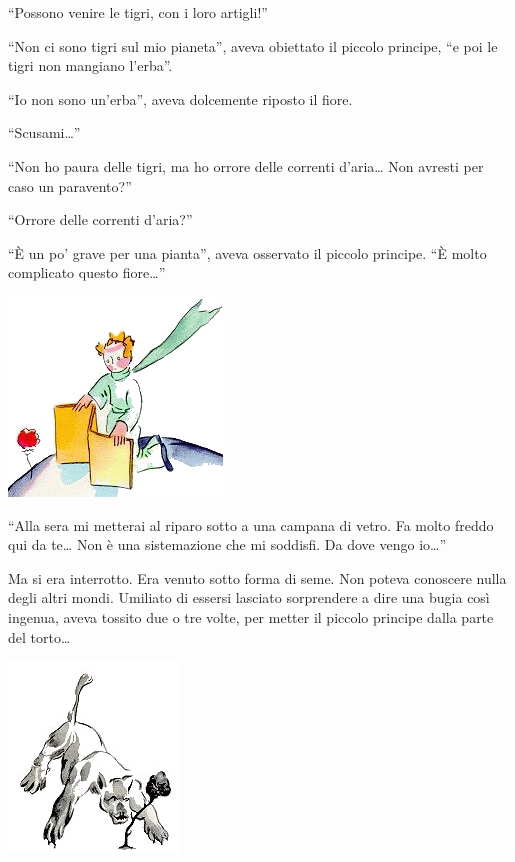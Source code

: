 \documentclass[11pt]{scrbook}
\begin{document}
``Possono venire le tigri, con i loro artigli!''

``Non ci sono tigri sul mio pianeta'', aveva obiettato il piccolo principe, ``e poi le tigri non mangiano l'erba''.

``Io non sono un'erba'', aveva dolcemente riposto il fiore.

``Scusami\ldots{}''

``Non ho paura delle tigri, ma ho orrore delle correnti d'aria\ldots{} Non avresti per caso un paravento?''

``Orrore delle correnti d'aria?''

``È un po' grave per una pianta'', aveva osservato il piccolo principe. ``È molto complicato questo fiore\ldots{}''

\begin{center}
\includegraphics{img/8c}
\end{center}

``Alla sera mi metterai al riparo sotto a una campana di vetro. Fa molto freddo qui da te\ldots{} Non è una sistemazione che mi soddisfi. Da dove vengo io\ldots{}''

Ma si era interrotto. Era venuto sotto forma di seme. Non poteva conoscere nulla degli altri mondi. Umiliato di essersi lasciato sorprendere a dire una bugia così ingenua, aveva tossito due o tre volte, per metter il piccolo principe dalla parte del torto\ldots{}

\begin{center}
\includegraphics{img/8d}
\end{center}
\end{document}
